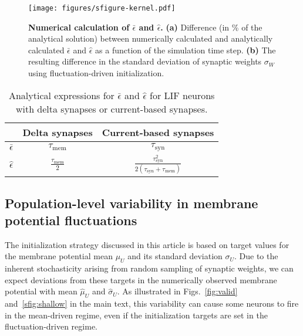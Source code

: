 \documentclass[11pt,a4paper]{article}
\begin{document}
\begin{refsection}
\begin{figure}[htb]
	\texttt{[image: figures/sfigure-kernel.pdf]}
\caption{\textbf{Numerical calculation of $\bar\epsilon$ and $\hat\epsilon$.}
	\textbf{(a)} Difference (in \% of the analytical solution) between numerically calculated and analytically calculated $\bar\epsilon$ and $\hat\epsilon$ as a function of the simulation time step. 
	\textbf{(b)} The resulting difference in the standard deviation of synaptic weights $\sigma_W$ using fluctuation-driven initialization.
}
\label{sfig:kernel}
\end{figure}

\renewcommand{\arraystretch}{1.5}
\begin{table}[htpb]
\setlength{\tabcolsep}{5pt}
\centering
\begin{tabular*}{0.6\textwidth}{@{\extracolsep{\fill}}ccc}
\toprule
 								& Delta synapses 						& Current-based synapses  \\
\midrule
$\bar \epsilon$					& $\tau_{\text{mem}}$					& $\tau_{\text{syn}}$				      \\
$\hat \epsilon$					& $\frac{\tau_{\text{mem}}}{2}$			&
$\frac{\tau_{\text{syn}}^2}{2(\tau_{\text{syn}}+\tau_{\text{mem}})}	$
\\
\bottomrule
\end{tabular*}
\caption{Analytical expressions for $\bar\epsilon$ and
$\hat\epsilon$ for LIF neurons with delta synapses or current-based synapses.}
\label{stab:epsilon}
\end{table}
\renewcommand{\arraystretch}{1.0}



\clearpage

\subsection{Population-level variability in membrane potential fluctuations}
\label{sup:popvar}

The initialization strategy discussed in this article is based on target
values for the membrane potential mean $\mu_U$ and its standard deviation
$\sigma_U$.
Due to the inherent stochasticity arising from random sampling of synaptic
weights, we can expect deviations from these targets in the numerically observed membrane potential with mean $\hat \mu_U$ and $\hat \sigma_U$. 
As illustrated in Figs.~\ref{fig:valid} and~\ref{sfig:shallow} in the main text, this variability can cause some neurons to fire in the mean-driven regime, even if the initialization targets
are set in the fluctuation-driven regime. 


\end{refsection}
\end{document}
